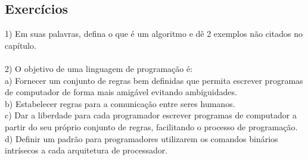 \documentclass[conference]{IEEEtran}
\begin{document}
  \begin{center}
      \subsection{Exercícios}
  \end{center}
  1) Em suas palavras, defina o que é um algoritmo e dê 2 exemplos não citados no capítulo.
  \\
  \\
  2) O objetivo de uma linguagem de programação é:
  \\
  a) Fornecer um conjunto de regras bem definidas que permita escrever programas de computador de forma mais amigável evitando ambiguidades.
  \\
  b) Estabelecer regras para a comunicação entre seres humanos.
  \\
  c) Dar a liberdade para cada programador escrever programas de computador a partir do seu próprio conjunto de regras, facilitando o processo de programação.
  \\
  d) Definir um padrão para programadores utilizarem os comandos binários intrísecos a cada arquitetura de processador.
  \\
\end{document}
